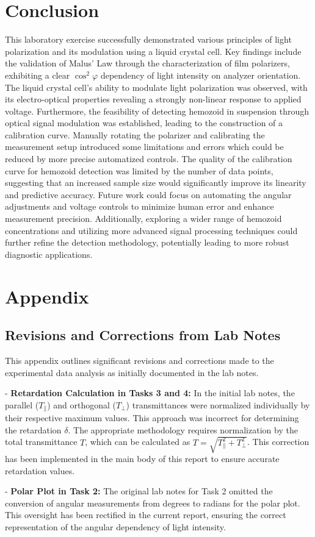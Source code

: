 \documentclass[12pt,a4paper]{article}
\begin{document}
\section{Conclusion}
This laboratory exercise successfully demonstrated various principles of light polarization and its modulation using a liquid crystal cell. Key findings include the validation of Malus' Law through the characterization of film polarizers, exhibiting a clear \( \cos^2\varphi \) dependency of light intensity on analyzer orientation. The liquid crystal cell's ability to modulate light polarization was observed, with its electro-optical properties revealing a strongly non-linear response to applied voltage. Furthermore, the feasibility of detecting hemozoid in suspension through optical signal modulation was established, leading to the construction of a calibration curve.
Manually rotating the polarizer and calibrating the measurement setup introduced some limitations and errors which could be reduced by more precise automatized controls. The quality of the calibration curve for hemozoid detection was limited by the number of data points, suggesting that an increased sample size would significantly improve its linearity and predictive accuracy. Future work could focus on automating the angular adjustments and voltage controls to minimize human error and enhance measurement precision. Additionally, exploring a wider range of hemozoid concentrations and utilizing more advanced signal processing techniques could further refine the detection methodology, potentially leading to more robust diagnostic applications.

\section{Appendix}

\subsection{Revisions and Corrections from Lab Notes}
This appendix outlines significant revisions and corrections made to the experimental data analysis as initially documented in the lab notes.

- \textbf{Retardation Calculation in Tasks 3 and 4:} In the initial lab notes, the parallel (\( T_\parallel \)) and orthogonal (\( T_\perp \)) transmittances were normalized individually by their respective maximum values. This approach was incorrect for determining the retardation \( \delta \). The appropriate methodology requires normalization by the total transmittance \( T \), which can be calculated as \( T=\sqrt{T_\parallel^2+T_\perp^2} \). This correction has been implemented in the main body of this report to ensure accurate retardation values.

- \textbf{Polar Plot in Task 2:} The original lab notes for Task 2 omitted the conversion of angular measurements from degrees to radians for the polar plot. This oversight has been rectified in the current report, ensuring the correct representation of the angular dependency of light intensity.

\end{document}
